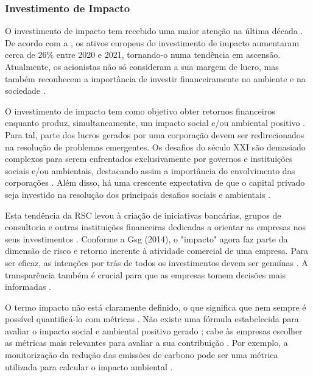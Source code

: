 \documentclass[portuguese]{textolivre}
\begin{document}
\subsubsection{Investimento de Impacto}\label{sec-titulo}
O investimento de impacto tem recebido uma maior atenção na última década \cite{ioannou_impact_2015}. De acordo com a \textcite{gsg_impact_new_2022}, os ativos europeus do investimento de impacto aumentaram cerca de 26\% entre 2020 e 2021, tornando-o numa tendência em ascensão. Atualmente, os acionistas não só consideram a sua margem de lucro, mas também reconhecem a importância de investir financeiramente no ambiente e na sociedade \cite{barber_impact_2017}.

O investimento de impacto tem como objetivo obter retornos financeiros enquanto produz, simultaneamente, um impacto social e/ou ambiental positivo \cite{barber_impact_2017,global_impact_investing_network_what_2023}. Para tal, parte dos lucros gerados por uma corporação devem ser redirecionados na resolução de problemas emergentes. Os desafios do século XXI são demasiado complexos para serem enfrentados exclusivamente por governos e instituições sociais e/ou ambientais, destacando assim a importância do envolvimento das corporações \cite{gsg_impact_new_2022}. Além disso, há uma crescente expectativa de que o capital privado seja investido na resolução dos principais desafios sociais e ambientais \cite{addy_calculating_2019}.

Esta tendência da RSC levou à criação de iniciativas bancárias, grupos de consultoria e outras instituições financeiras dedicadas a orientar as empresas nos seus investimentos \cite{barber_impact_2017}. Conforme a Gsg (2014), o "impacto" agora faz parte da dimensão de risco e retorno inerente à atividade comercial de uma empresa. Para ser eficaz, as intenções por trás de todos os investimentos devem ser genuínas \cite{barber_impact_2017,arora_understanding_2021,global_impact_investing_network_what_2023}. A transparência também é crucial para que as empresas tomem decisões mais informadas \cite{gsg_impact_new_2022}.

O termo impacto não está claramente definido, o que significa que nem sempre é possível quantificá-lo com métricas \cite{arora_understanding_2021}. Não existe uma fórmula estabelecida para avaliar o impacto social e ambiental positivo gerado \cite{addy_calculating_2019}; cabe às empresas escolher as métricas mais relevantes para avaliar a sua contribuição \cite{global_impact_investing_network_what_2023}. Por exemplo, a monitorização da redução das emissões de carbono pode ser uma métrica utilizada para calcular o impacto ambiental \cite{tora_three_2023}.
\end{document}
